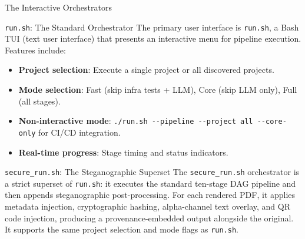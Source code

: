 \documentclass[
  ignorenonframetext,
]{beamer}
\providecommand{\tightlist}{%
  \setlength{\itemsep}{0pt}\setlength{\parskip}{0pt}}
\begin{document}
\begin{frame}[fragile]{The Interactive Orchestrators}
\protect{}\label{the-interactive-orchestrators}
\begin{block}{\texttt{run.sh}: The Standard Orchestrator}
\protect{}\label{run.sh-the-standard-orchestrator}
The primary user interface is \texttt{run.sh}, a Bash TUI (text user
interface) that presents an interactive menu for pipeline execution.
Features include:

\begin{itemize}
\tightlist
\item
  \textbf{Project selection}: Execute a single project or all discovered
  projects.
\item
  \textbf{Mode selection}: Fast (skip infra tests + LLM), Core (skip LLM
  only), Full (all stages).
\item
  \textbf{Non-interactive mode}:
  \texttt{./run.sh\ -\/-pipeline\ -\/-project\ all\ -\/-core-only} for
  CI/CD integration.
\item
  \textbf{Real-time progress}: Stage timing and status indicators.
\end{itemize}
\end{block}

\begin{block}{\texttt{secure\_run.sh}: The Steganographic Superset}
\protect{}\label{secure_run.sh-the-steganographic-superset}
The \texttt{secure\_run.sh} orchestrator is a strict superset of
\texttt{run.sh}: it executes the standard ten-stage DAG pipeline and
then appends steganographic post-processing. For each rendered PDF, it
applies metadata injection, cryptographic hashing, alpha-channel text
overlay, and QR code injection, producing a provenance-embedded output
alongside the original. It supports the same project selection and mode
flags as \texttt{run.sh}.
\end{block}
\end{frame}
\end{document}
